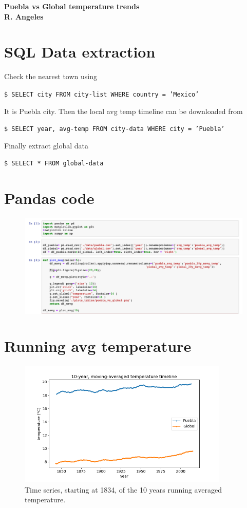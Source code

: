 \documentclass{article}
\newcommand{\sh}[1]{\indent\indent\texttt{\footnotesize\$ #1}}
\begin{document}
    {\bfseries\Large
        Puebla vs Global temperature trends\\
        \vskip1cm
        R. Angeles\\
    }    




\section{SQL Data extraction}

Check the nearest town using

\sh{SELECT city FROM city-list WHERE country = 'Mexico'}

It is Puebla city. Then the local avg temp timeline can be downloaded from

\sh{SELECT year, avg-temp FROM city-data WHERE city = 'Puebla' }

Finally extract global data 

\sh{SELECT * FROM global-data }

\section{Pandas code}

\begin{figure}[!h]
\centering
  \includegraphics[width=120mm]{../plots_tables/jupyter.png}
\end{figure}

\section{Running avg temperature}
\begin{figure}[!h]
\centering
  \includegraphics[width=100mm]{../plots_tables/puebla_vs_global.png}
  \caption{Time series, starting at 1834, of the 10 years running averaged temperature.}\label{fig:vs}
\end{figure}
\end{document}
